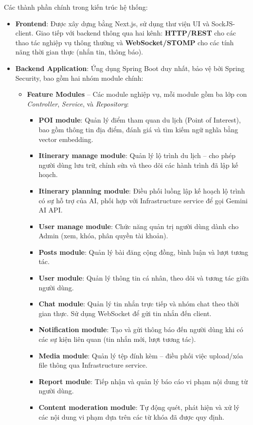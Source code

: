 Các thành phần chính trong kiến trúc hệ thống:
\begin{itemize}
    \item \textbf{Frontend}: Được xây dựng bằng Next.js, sử dụng thư viện UI và SockJS-client. Giao tiếp với backend thông qua hai kênh: \textbf{HTTP/REST} cho các thao tác nghiệp vụ thông thường và \textbf{WebSocket/STOMP} cho các tính năng thời gian thực (nhắn tin, thông báo).

    \item \textbf{Backend Application}: Ứng dụng Spring Boot duy nhất, bảo vệ bởi Spring Security, bao gồm hai nhóm module chính:
          \begin{itemize}
              \item \textbf{Feature Modules} -- Các module nghiệp vụ, mỗi module gồm ba lớp con \textit{Controller}, \textit{Service}, và \textit{Repository}:
                    \begin{itemize}
                        \item \textbf{POI module}: Quản lý điểm tham quan du lịch (Point of Interest), bao gồm thông tin địa điểm, đánh giá và tìm kiếm ngữ nghĩa bằng vector embedding.
                        \item \textbf{Itinerary manage module}: Quản lý lộ trình du lịch -- cho phép người dùng lưu trữ, chỉnh sửa và theo dõi các hành trình đã lập kế hoạch.
                        \item \textbf{Itinerary planning module}: Điều phối luồng lập kế hoạch lộ trình có sự hỗ trợ của AI, phối hợp với Infrastructure service để gọi Gemini AI API.
                        \item \textbf{User manage module}: Chức năng quản trị người dùng dành cho Admin (xem, khóa, phân quyền tài khoản).
                        \item \textbf{Posts module}: Quản lý bài đăng cộng đồng, bình luận và lượt tương tác.
                        \item \textbf{User module}: Quản lý thông tin cá nhân, theo dõi và tương tác giữa người dùng.
                        \item \textbf{Chat module}: Quản lý tin nhắn trực tiếp và nhóm chat theo thời gian thực. Sử dụng WebSocket để gửi tin nhắn đến client.
                        \item \textbf{Notification module}: Tạo và gửi thông báo đến người dùng khi có các sự kiện liên quan (tin nhắn mới, lượt tương tác).
                        \item \textbf{Media module}: Quản lý tệp đính kèm -- điều phối việc upload/xóa file thông qua Infrastructure service.
                        \item \textbf{Report module}: Tiếp nhận và quản lý báo cáo vi phạm nội dung từ người dùng.
                        \item \textbf{Content moderation module}: Tự động quét, phát hiện và xử lý các nội dung vi phạm dựa trên các từ khóa đã được quy định.
                    \end{itemize}
                    

\end{itemize}
\end{itemize}
